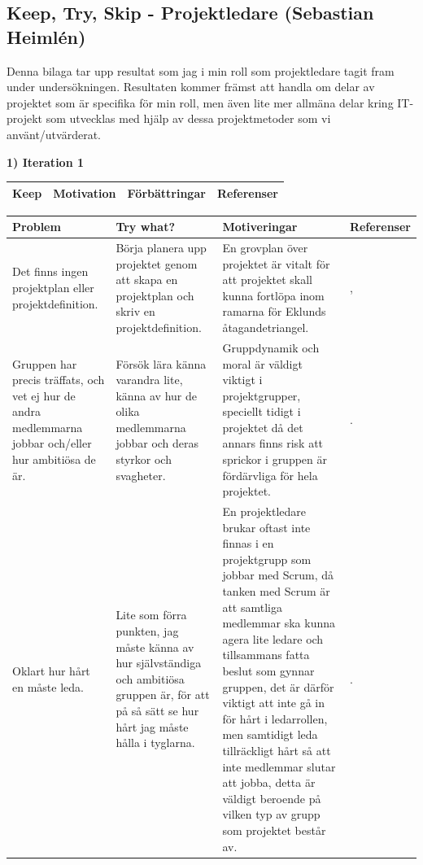 \documentclass[conference,a4paper]{IEEEtran}
\newcommand\Tstrut{\rule{0pt}{2.6ex}}       %
\newcommand\Bstrut{\rule[-0.9ex]{0pt}{0pt}} %
\newcommand{\TBstrut}{\Tstrut\Bstrut} %
\begin{document}
\subsection{Keep, Try, Skip - Projektledare (Sebastian Heimlén)}

Denna bilaga tar upp resultat som jag i min roll som projektledare tagit fram under undersökningen. Resultaten kommer främst att handla om delar av projektet som är specifika för min roll, men även lite mer allmäna delar kring IT-projekt som utvecklas med hjälp av dessa projektmetoder som vi använt/utvärderat.

\textbf{1) Iteration 1}

\begin{table}[H]
	\small
  \centering
	\begin{tabular}{|p{1.5cm}|p{2cm}|p{1.8cm}|p{1.5cm}|} %
    \hline
    Keep & Motivation & Förbättringar & Referenser \TBstrut \\
    \hline
  \end{tabular}
\end{table}

\begin{table}[H]
	\small
  \centering
	\begin{tabular}{|p{1.5cm}|p{2cm}|p{1.8cm}|p{1.5cm}|} %
    \hline
    Problem & Try what? & Motiveringar & Referenser \TBstrut \\
    \hline
    Det finns ingen projektplan eller projektdefinition. & Börja planera upp projektet genom att skapa en projektplan och skriv en projektdefinition. & En grovplan över projektet är vitalt för att projektet skall kunna fortlöpa inom ramarna för Eklunds åtagandetriangel. & \cite[s. 128]{Eklund14}, \cite[s. 72]{Sommerville10} \TBstrut \\
    \hline
    Gruppen har precis träffats, och vet ej hur de andra medlemmarna jobbar och/eller hur ambitiösa de är. & Försök lära känna varandra lite, känna av hur de olika medlemmarna jobbar och deras styrkor och svagheter. & Gruppdynamik och moral är väldigt viktigt i projektgrupper, speciellt tidigt i projektet då det annars finns risk att sprickor i gruppen är fördärvliga för hela projektet. & \cite[kap. 7]{Eklund14}. \TBstrut \\
    \hline
    Oklart hur hårt en måste leda. & Lite som förra punkten, jag måste känna av hur självständiga och ambitiösa gruppen är, för att på så sätt se hur hårt jag måste hålla i tyglarna. & En projektledare brukar oftast inte finnas i en projektgrupp som jobbar med Scrum, då tanken med Scrum är att samtliga medlemmar ska kunna agera lite ledare och tillsammans fatta beslut som gynnar gruppen, det är därför viktigt att inte gå in för hårt i ledarrollen, men samtidigt leda tillräckligt hårt så att inte medlemmar slutar att jobba, detta är väldigt beroende på vilken typ av grupp som projektet består av. & \cite[s. 73-74]{Sommerville10}. \TBstrut \\
    \hline
  \end{tabular}
\end{table}
\end{document}
